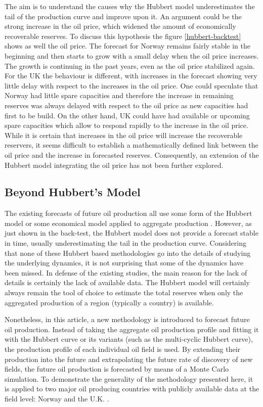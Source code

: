\documentclass[review]{elsarticle}
\begin{document}
The aim is to understand the causes why the Hubbert model underestimates the tail of the production curve and improve upon it. An argument could be the strong increase in the oil price, which widened the amount of economically recoverable reserves. To discuss this hypothesis the figure \ref{hubbert-backtest} shows as well the oil price. The forecast for Norway remains fairly stable in the beginning and then starts to grow with a small delay when the oil price increases. The growth is continuing in the past years, even as the oil price stabilized again. For the UK the behaviour is different, with increases in the forecast showing very little delay with respect to the increases in the oil price. One could speculate that Norway had little spare capacities and therefore the increase in remaining reserves was always delayed with respect to the oil price as new capacities had first to be build. On the other hand, UK could have had available or upcoming spare capacities which allow to respond rapidly to the increase in the oil price. While it is certain that increases in the oil price will increase the recoverable reservers, it seems difficult to establish a mathematically defined link between the oil price and the increase in forecasted reserves. Consequently, an extension of the Hubbert model integrating the oil price has not been further explored.


\subsection{Beyond Hubbert's Model}

The existing forecasts of future oil production all use some form of the
Hubbert model \citep{Brecha2012,Laherrere2002,Lynch2002}
or some economical model applied to aggregate production \citep{Greiner2011}.
 However, as just shown in the back-test, the Hubbert model does not provide a
forecast stable in time, usually underestimating the tail in the production curve.
Considering that none of these Hubbert based methodologies go into the details of studying the underlying dynamics, it is not surprising that some of the dynamics have been missed.
In defense of the existing studies, the main reason for the lack of details is certainly the lack of available data. The Hubbert model will certainly always remain the tool of choice to estimate the total reserves when only the aggregated production of a region (typically a country) is available. 

Nonetheless, in this article, a new methodology is introduced to forecast future
oil production. Instead of taking the aggregate oil production profile
and fitting it with the Hubbert curve or its variants (such as the
multi-cyclic Hubbert curve), the production profile of each individual
oil field is used. By extending their production into the future and
extrapolating the future rate of discovery of new fields, the future
oil production is forecasted by means of a Monte Carlo simulation.
To demonstrate the generality of the methodology presented here,
it is applied to two major oil producing countries with publicly available
data at the field level: Norway  and the U.K. \citep{GOVUK2014}.
\end{document}
